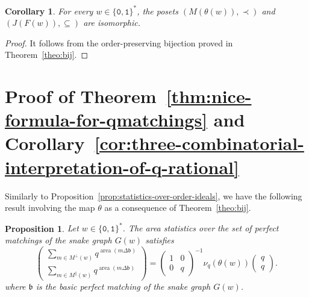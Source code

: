 \documentclass[a4paper,12pt]{amsart}
\newtheorem{proposition}[definition]{Proposition}
\newtheorem{corollary}[definition]{Corollary}
\newcommand{\bfrak}{{\mathfrak{b}}}
\newcommand{\0}{\mathtt{0}}
\newcommand{\1}{\mathtt{1}}
\newcommand{\2}{\mathtt{2}}
\newcommand{\3}{\mathtt{3}}
\newcommand{\carreplein}{{\perp}}
\newcommand{\carrevide}{{\parallel}}
\DeclareMathOperator{\area}{area}
\begin{document}
\begin{corollary}\label{cor:poset-isomorphism-matchings-to-order-ideals}
For every $w\in\{\0,\1\}^*$,
the posets $(M(\theta(w)),\prec)$ and $(J(F(w)), \subseteq)$
are isomorphic.
\end{corollary}

\begin{proof}
    It follows from the order-preserving bijection proved in
    Theorem~\ref{theo:bij}.
\end{proof}


%
\section{Proof of Theorem~\ref{thm:nice-formula-for-qmatchings}
and Corollary~\ref{cor:three-combinatorial-interpretation-of-q-rational}}
\label{sec:proof-of-thm:nice-formula-for-qmatchings}

Similarly to Proposition~\ref{prop:statistics-over-order-ideals},
we have the following result involving the map $\theta$
as a consequence of Theorem~\ref{theo:bij}.

\begin{proposition}\label{prop:statistics-over-snake-graph-Gw}
    Let $w\in\{\0,\1\}^*$.
The area statistics over the set of perfect matchings
of the snake graph $G(w)$ satisfies
\begin{equation*}
\left(\begin{array}{r}
    \sum_{m\in M^\carreplein(w)} q^{\area(m\Delta\bfrak)}\\
        \sum_{m\in M^\carrevide (w)} q^{\area(m\Delta\bfrak)}
\end{array}\right)
    =
    \left(\begin{smallmatrix} 1 & 0 \\ 0 & q \end{smallmatrix}\right)^{-1}
            \nu_q(\theta(w))
        \left(\begin{array}{c} q \\ q \end{array}\right).
\end{equation*}
where $\bfrak$ is the basic perfect matching of the snake graph $G(w)$.
\end{proposition}
\end{document}
